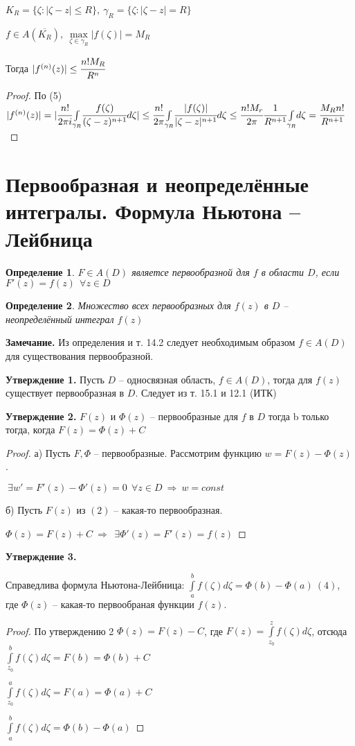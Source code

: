 \documentclass[final]{report}
\renewcommand{\bf}{\bfseries}
\newcommand{\then}{\ \Rightarrow\ }
\newcommand{\mint}[2]{\underset{#1}{\overset{#2}{\int}}}
\newcommand{\mmax}[1]{\underset{#1}{\max}}
\renewcommand{\bar}{\overline}
\newcommand{\g}{\gamma}
\newcommand{\E}{\ \exists}
\newcommand{\F}{\ \forall}
\newcommand{\opr}[1]{\begin{opred}#1\end{opred}}
\newtheorem*{opred}{Определение}
\theoremstyle{remark}
\begin{document}
$K_R=\{\zeta\colon|\zeta-z|\leq R\},\ \g_R=\{\zeta\colon|\zeta-z|=R\}$

$f\in A(\bar{K_R}),\ \mmax{\zeta\in\g_R}|f(\zeta)|=M_R$

Тогда $|f^{(n)}(z)|\leq\cfrac{n!M_R}{R^n}$
\begin{proof}
По (5) $|f^{(n)}(z)|=|\cfrac{n!}{2\pi i}\mint{\g_R}{}\cfrac{f(\zeta)}{(\zeta-z)^{n+1}}d\zeta|\leq \cfrac {n!}{2\pi}\mint{\g_R}{}\cfrac{|f(\zeta)|}{|\zeta-z|^{n+1}}d\zeta\leq\cfrac{n!M_r}{2\pi}\cfrac1{R^{n+1}}\mint{\g_R}{}d\zeta=\cfrac{M_Rn!}{R^{n+1}}$
\end{proof}

\newpage

\section{Первообразная и неопределённые интегралы. Формула Ньютона -- Лейбница}

\opr{$F\in A(D)$ являетсе первообразной для $f$ в области $D$, если $F'(z)=f(z)\ \F z\in D$}

\opr{Множество всех первообразных для $f(z)$ в $D$ -- неопределённый интеграл $f(z)$}

{\bf Замечание.} Из определения и т. 14.2 следует необходимым образом $f\in A(D)$ для существования первообразной.

{\bf Утверждение 1.} Пусть $D$ -- односвязная область, $f\in A(D)$, тогда для $f(z)$ существует первообразная в $D$. Следует из т. 15.1 и 12.1 (ИТК)

{\bf Утверждение 2.} $F(z)$ и $\Phi(z)$ -- первообразные для $f$ в $D$ тогда b только тогда, когда $F(z)=\Phi(z)+C$
\begin{proof}
а) Пусть $F,\Phi$ -- первообразные. Рассмотрим функцию $w=F(z)-\Phi(z)$.

$\E w'=F'(z)-\Phi'(z)=0\ \F z\in D\then w=const$

б) Пусть $F(z)$ из $(2)$ -- какая-то первообразная.

$\Phi(z)=F(z)+C\then \E \Phi'(z)=F'(z)=f(z)$
\end{proof}

{\bf Утверждение 3.}

Справедлива формула Ньютона-Лейбница:
$\mint{a}{b}f(\zeta)d\zeta=\Phi(b)-\Phi(a)\ (4)$, где $\Phi(z)$ -- какая-то первообраная функции $f(z)$.
\begin{proof}
По утверждению 2 $\Phi(z)=F(z)-C$, где $F(z)=\mint{z_0}{z}f(\zeta)d\zeta$, отсюда $\mint{z_0}{b}f(\zeta)d\zeta=F(b)=\Phi(b)+C$

$\mint{z_0}{a}f(\zeta)d\zeta=F(a)=\Phi(a)+C$

$\mint{a}{b}f(\zeta)d\zeta=\Phi(b)-\Phi(a)$
\end{proof}
\newpage
\end{document}

